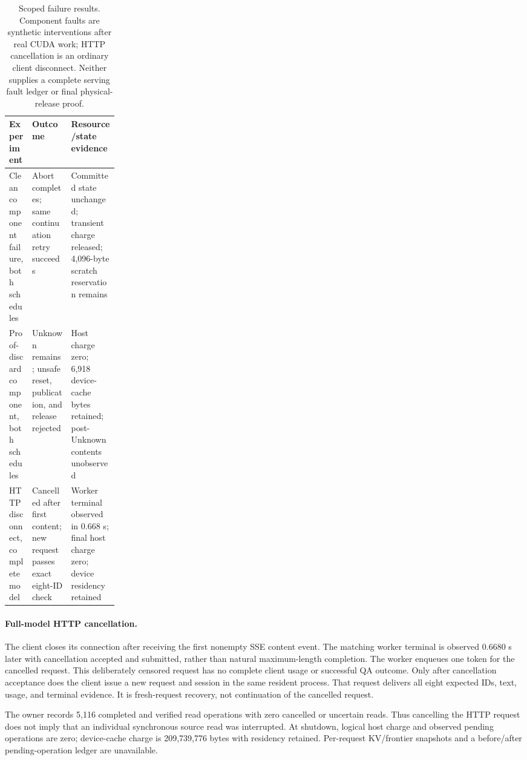 \begin{table}[!htbp]
\centering
\small
\begin{tabularx}{\linewidth}{@{}>{\raggedright\arraybackslash}p{0.21\linewidth}>{\raggedright\arraybackslash}X>{\raggedright\arraybackslash}X@{}}
\toprule
Experiment & Outcome & Resource/state evidence \\
\midrule
Clean component failure, both schedules & Abort completes; same continuation retry succeeds & Committed state unchanged; transient charge released; 4,096-byte scratch reservation remains \\
Proof-discard component, both schedules & Unknown remains; unsafe reset, publication, and release rejected & Host charge zero; 6,918 device-cache bytes retained; post-Unknown contents unobserved \\
HTTP disconnect, complete model & Cancelled after first content; new request passes exact eight-ID check & Worker terminal observed in 0.668 s; final host charge zero; device residency retained \\
\bottomrule
\end{tabularx}
\caption{Scoped failure results. Component faults are synthetic interventions
after real CUDA work; HTTP cancellation is an ordinary client disconnect.
Neither supplies a complete serving fault ledger or final physical-release proof.}
\label{tab:failure-results}
\end{table}

\paragraph{Full-model HTTP cancellation.}
The client closes its connection after receiving the first nonempty SSE
content event. The matching worker terminal is observed 0.6680 s later with
cancellation accepted and submitted, rather than natural maximum-length
completion. The worker enqueues one token for the cancelled request. This
deliberately censored request has no complete client usage or successful QA outcome.
Only after cancellation acceptance does the client issue a new request and
session in the same resident process. That request delivers all eight
expected IDs, text, usage, and terminal evidence. It is fresh-request
recovery, not continuation of the cancelled request.

The owner records 5,116 completed and verified read operations with zero
cancelled or uncertain reads. Thus cancelling the HTTP request does not imply
that an individual synchronous source read was interrupted. At shutdown,
logical host charge and observed pending operations are zero; device-cache
charge is 209,739,776 bytes with residency retained. Per-request KV/frontier
snapshots and a before/after pending-operation ledger are unavailable.

